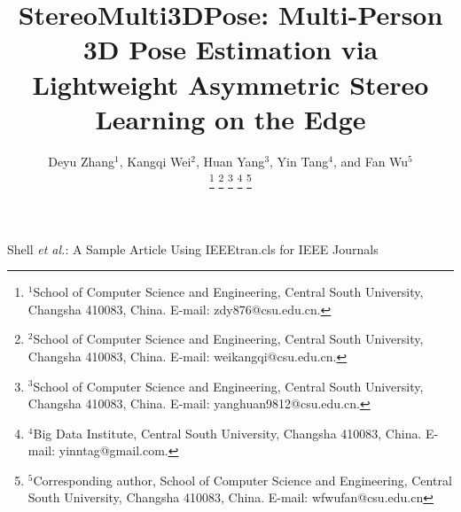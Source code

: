 \documentclass[journal]{IEEEtran}
\begin{document}
\title{StereoMulti3DPose: Multi-Person 3D Pose Estimation via Lightweight Asymmetric Stereo Learning on the Edge}

\author{
Deyu Zhang$^1$,
Kangqi Wei$^2$,
Huan Yang$^3$,
Yin Tang$^4$,
and Fan Wu$^5$

\thanks{$^1$School of Computer Science and Engineering, Central South University, Changsha 410083, China. E-mail: zdy876@csu.edu.cn.}
\thanks{$^2$School of Computer Science and Engineering, Central South University, Changsha 410083, China. E-mail: weikangqi@csu.edu.cn.}
\thanks{$^3$School of Computer Science and Engineering, Central South University, Changsha 410083, China. E-mail: yanghuan9812@csu.edu.cn.}
\thanks{$^4$Big Data Institute, Central South University, Changsha 410083, China. E-mail: yinntag@gmail.com.}
\thanks{$^5$Corresponding author, School of Computer Science and Engineering, Central South University, Changsha 410083, China. E-mail: wfwufan@csu.edu.cn}

}

{Shell \MakeLowercase{\textit{et al.}}: A Sample Article Using IEEEtran.cls for IEEE Journals}



\maketitle
\end{document}
